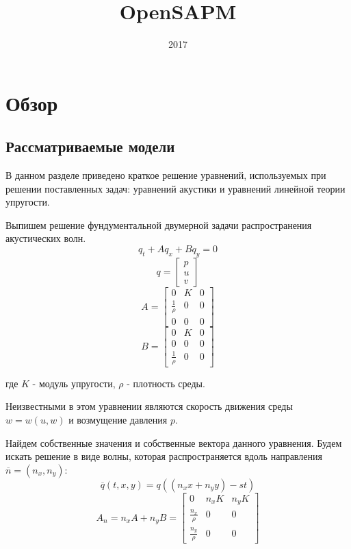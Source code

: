 \documentclass{article}
\title{OpenSAPM}
\date{2017}
\begin{document}
\maketitle
\section{Обзор}
\subsection{Рассматриваемые модели}

В данном разделе приведено краткое решение уравнений, используемых при решении поставленных задач: уравнений акустики и уравнений линейной теории упругости.

Выпишем решение фундументальной двумерной задачи распространения акустических волн.
\begin{equation}
\label{eq_one}
q_t + A q_x + B q_y = 0
\end{equation}
$$q = \left[\begin{array}{crl}
p \\
u \\
v
\end{array}\right] $$
$$A = \left[\begin{array}{crl}
0 & K & 0 \\
\frac{1}{\rho} & 0 & 0\\
0 & 0 & 0
\end{array}\right]$$
$$B = \left[\begin{array}{crl}
0 & K & 0 \\
0 & 0 & 0\\
\frac{1}{\rho} & 0 & 0
\end{array}\right] $$

где $K$ - модуль упругости, $\rho$ - плотность среды.

Неизвестными в этом уравнении являются скорость движения среды $w = w(u, w)$ и возмущение давления $p$.

Найдем собственные значения и собственные вектора данного уравнения. Будем искать решение в виде волны, которая распространяется вдоль направления $\overline{n} = (n_x, n_y)$:
\begin{equation}
\label{eq_two}
\overline{q}(t,x,y) = q((n_x x + n_y y) - s t)
\end{equation}
\begin{equation}
\label{eq_three}
A_n = n_x A + n_y B = \left[\begin{array}{crl}
0 & n_x K & n_y K \\
\frac{n_x}{\rho} & 0 & 0\\
\frac{n_y}{\rho} & 0 & 0
\end{array}\right] 
\end{equation}
\end{document}
